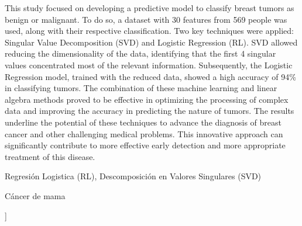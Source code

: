 \documentclass[a4paper,10pt,twocolumn]{article}
\begin{document}
\begin{enabstract}

 This study focused on developing a predictive model to classify breast tumors as benign or malignant. To do so, a dataset with 30 features from 569 people was used, along with their respective classification. Two key techniques were applied: Singular Value Decomposition (SVD) and Logistic Regression (RL). SVD allowed reducing the dimensionality of the data, identifying that the first 4 singular values ​​concentrated most of the relevant information. Subsequently, the Logistic Regression model, trained with the reduced data, showed a high accuracy of 94\% in classifying tumors.
The combination of these machine learning and linear algebra methods proved to be effective in optimizing the processing of complex data and improving the accuracy in predicting the nature of tumors. The results underline the potential of these techniques to advance the diagnosis of breast cancer and other challenging medical problems. This innovative approach can significantly contribute to more effective early detection and more appropriate treatment of this disease.
\end{enabstract}

\begin{keywords}
	Regresión Logistica (RL),
	Descomposición en Valores Singulares (SVD)
\end{keywords}

\begin{topics}
	Cáncer de mama
\end{topics}


\vspace{0.8cm}
]



\end{document}

